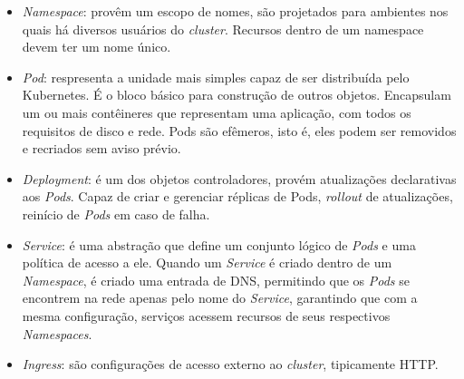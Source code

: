 	    \begin{itemize}
	        \item \textit{Namespace}: provêm um escopo de nomes, são projetados para ambientes nos quais há diversos usuários do \textit{cluster}. Recursos dentro de um namespace devem ter um nome único.\cite{k8sdocsnamespace}
	        \item \textit{Pod}: respresenta a unidade mais simples capaz de ser distribuída pelo Kubernetes. É o bloco básico para construção de outros objetos. Encapsulam um ou mais contêineres que representam uma aplicação, com todos os requisitos de disco e rede. Pods são efêmeros, isto é, eles podem ser removidos e recriados sem aviso prévio. \cite{k8sdocspods}
	        \item \textit{Deployment}: é um dos objetos controladores, provém atualizações declarativas aos \textit{Pods}. Capaz de criar e gerenciar réplicas de Pods, \textit{rollout} de atualizações, reinício de \textit{Pods} em caso de falha. \cite{k8sdocsdeployments}
	        \item \textit{Service}: é uma abstração que define um conjunto lógico de \textit{Pods} e uma política de acesso a ele.\cite{k8sdocsservice} Quando um \textit{Service} é criado dentro de um \textit{Namespace}, é criado uma entrada de DNS, permitindo que os \textit{Pods} se encontrem na rede apenas pelo nome do \textit{Service}, garantindo que com a mesma configuração, serviços acessem recursos de seus respectivos \textit{Namespaces}. \cite{k8sdocsnamespace}
	        \item \textit{Ingress}: são configurações de acesso externo ao \textit{cluster}, tipicamente HTTP. \cite{k8sdocsingress} 
	    \end{itemize}
